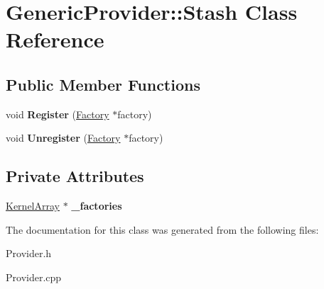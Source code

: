 \hypertarget{class_generic_provider_1_1_stash}{}\section{Generic\+Provider\+:\+:Stash Class Reference}
\label{class_generic_provider_1_1_stash}
\subsection*{Public Member Functions}
\begin{DoxyCompactItemize}
\item 
\mbox{\label{class_generic_provider_1_1_stash_a78c4cbc64e3de4715a996cdbdd67c63f}} 
void {\bfseries Register} (\hyperlink{class_generic_provider_1_1_factory}{Factory} $\ast$factory)
\item 
\mbox{\label{class_generic_provider_1_1_stash_a76552211e718c3db484de1541e868eae}} 
void {\bfseries Unregister} (\hyperlink{class_generic_provider_1_1_factory}{Factory} $\ast$factory)
\end{DoxyCompactItemize}
\subsection*{Private Attributes}
\begin{DoxyCompactItemize}
\item 
\mbox{\label{class_generic_provider_1_1_stash_a637edae2d24d468302b83a5a9e411587}} 
\hyperlink{class_kernel_array}{Kernel\+Array} $\ast$ {\bfseries \+\_\+factories}
\end{DoxyCompactItemize}


The documentation for this class was generated from the following files\+:\begin{DoxyCompactItemize}
\item 
Provider.\+h\item 
Provider.\+cpp\end{DoxyCompactItemize}
